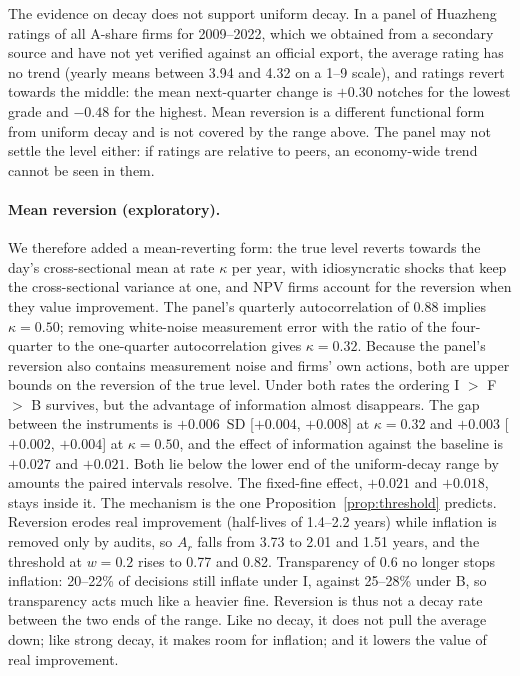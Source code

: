 \documentclass[11pt]{article}
\begin{document}
The evidence on decay does not support uniform decay. In a panel of Huazheng ratings of all A-share firms for 2009--2022, which we obtained from a secondary source and have not yet verified against an official export, the average rating has no trend (yearly means between 3.94 and 4.32 on a 1--9 scale), and ratings revert towards the middle: the mean next-quarter change is $+0.30$ notches for the lowest grade and $-0.48$ for the highest. Mean reversion is a different functional form from uniform decay and is not covered by the range above. The panel may not settle the level either: if ratings are relative to peers, an economy-wide trend cannot be seen in them.

\paragraph{Mean reversion (exploratory).} We therefore added a mean-reverting form: the true level reverts towards the day's cross-sectional mean at rate $\kappa$ per year, with idiosyncratic shocks that keep the cross-sectional variance at one, and NPV firms account for the reversion when they value improvement. The panel's quarterly autocorrelation of 0.88 implies $\kappa = 0.50$; removing white-noise measurement error with the ratio of the four-quarter to the one-quarter autocorrelation gives $\kappa = 0.32$. Because the panel's reversion also contains measurement noise and firms' own actions, both are upper bounds on the reversion of the true level. Under both rates the ordering I $>$ F $>$ B survives, but the advantage of information almost disappears. The gap between the instruments is $+0.006$~SD [$+0.004$, $+0.008$] at $\kappa = 0.32$ and $+0.003$ [$+0.002$, $+0.004$] at $\kappa = 0.50$, and the effect of information against the baseline is $+0.027$ and $+0.021$. Both lie below the lower end of the uniform-decay range by amounts the paired intervals resolve. The fixed-fine effect, $+0.021$ and $+0.018$, stays inside it. The mechanism is the one Proposition~\ref{prop:threshold} predicts. Reversion erodes real improvement (half-lives of 1.4--2.2 years) while inflation is removed only by audits, so $A_r$ falls from 3.73 to 2.01 and 1.51 years, and the threshold at $w = 0.2$ rises to 0.77 and 0.82. Transparency of 0.6 no longer stops inflation: 20--22\% of decisions still inflate under I, against 25--28\% under B, so transparency acts much like a heavier fine. Reversion is thus not a decay rate between the two ends of the range. Like no decay, it does not pull the average down; like strong decay, it makes room for inflation; and it lowers the value of real improvement.
\end{document}
